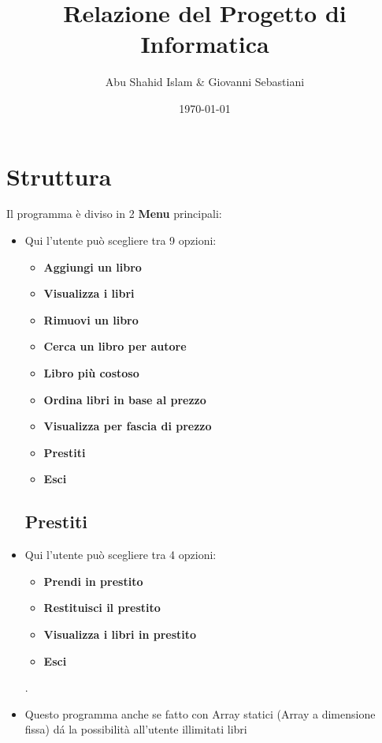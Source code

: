 \documentclass[a4paper,12pt]{article}
\title{Relazione del Progetto di Informatica}
\author{Abu Shahid Islam \& Giovanni Sebastiani}
\date{\today}
\begin{document}
\maketitle

\newpage

\tableofcontents %

\newpage

\section{Struttura} 
Il programma è diviso in 2 \textbf{Menu} principali:
\begin{itemize}
    \subsection{Menu Principale}
        \item Qui l'utente può scegliere tra 9 opzioni: \begin{itemize}
        \item \textbf{Aggiungi un libro}
        \item \textbf{Visualizza i libri}
        \item \textbf{Rimuovi un libro}
        \item \textbf{Cerca un libro per autore}
        \item \textbf{Libro più costoso}
        \item \textbf{Ordina libri in base al prezzo}
        \item \textbf{Visualizza per fascia di prezzo}
        \item \textbf{Prestiti}
        \item \textbf{Esci}
    \end{itemize}
    \subsection{Prestiti}
    \item Qui l'utente può scegliere tra 4 opzioni: \begin{itemize}
        \item \textbf{Prendi in prestito}
        \item \textbf{Restituisci il prestito}
        \item \textbf{Visualizza i libri in prestito}
        \item \textbf{Esci}
    \end{itemize}.
    \item Questo programma anche se fatto con Array statici (Array a dimensione fissa) dá la possibilità all'utente illimitati libri
\end{itemize}
\end{document}
